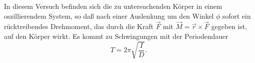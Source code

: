 In diesem Versuch befinden sich die zu untersuchenden Körper in einem
oszillierendem System, so daß nach einer Auslenkung um den Winkel $\phi$
sofort ein rücktreibendes Drehmoment, das durch die Kraft $\vec{F}$ mit
$\vec{M} = \vec{r} \times \vec{F}$ gegeben ist, auf den Körper wirkt.
Es kommt zu Schwingungen mit der Periodendauer
\begin{equation}
  \label{eq:periode}
  T = 2 \pi \sqrt{\frac{I}{D}}.
\end{equation}

